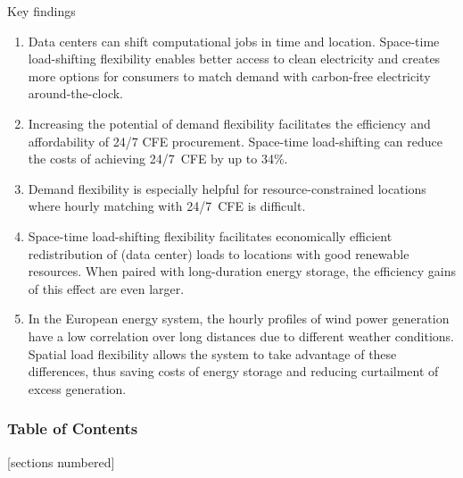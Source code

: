 \begin{frame}{Key findings}

  \centering
  {\footnotesize

    \begin{enumerate}

      \item Data centers can shift computational jobs in time and location. Space-time load-shifting flexibility enables \alert{better access to clean electricity} and creates \alert{more options} for consumers to match demand with carbon-free electricity around-the-clock. 

      \item Increasing the potential of demand flexibility facilitates the \alert{efficiency and affordability} of 24/7 CFE procurement. Space-time
      load-shifting can reduce the costs of achieving 24/7~CFE by up to 34\%.

      \item Demand flexibility is \alert{especially helpful for resource-constrained locations} where hourly matching with 24/7~CFE is difficult.

      \item Space-time load-shifting flexibility facilitates \alert{economically efficient redistribution of (data center) loads} to locations with good renewable resources. When paired with long-duration energy storage, the efficiency gains of this effect are even larger.
      
      \item In the European energy system, the hourly profiles of wind power
      generation have a low correlation over long distances due to
      different weather conditions. Spatial load flexibility
      allows the system to take advantage of these differences, thus \alert{saving costs of energy storage} and \alert{reducing curtailment} of excess generation. 

  \end{enumerate}
  }
  
\end{frame}



\begin{frame}
  \frametitle{Table of Contents}
  {\small
  [sections numbered]
  \tableofcontents[hideallsubsections]
  }
\end{frame}



